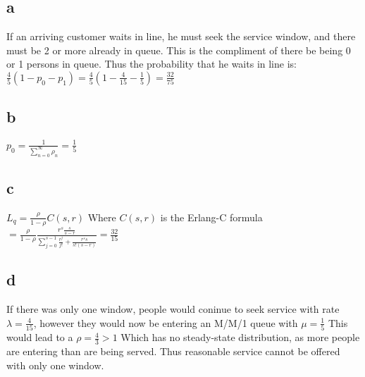 \documentclass[10pt, letterpaper]{paper}
\begin{document}
\subsection*{a}
If an arriving customer waits in line, he must seek the service window, and there must be 2 or more already in queue. This is the compliment of there be being 0 or 1 persons in queue.
Thus the probability that he waits in line is: $\frac{4}{5} ( 1- p_0 - p_1 ) = \frac{4}{5} ( 1 - \frac{ 4}{15} - \frac{1}{5} ) = \frac{ 32}{75}$
\subsection*{b} 
$p_0 = \frac{ 1 }{ \sum_{n=0}^\infty \rho_n} = \frac{1}{5}$
\subsection*{c}
$L_q = \frac{ \rho }{ 1 - \rho } C( s,r )$ Where $C(s,r)$ is the Erlang-C formula $= \frac{ \rho }{ 1 - \rho } \frac{ r^s \frac{ s }{ s- r} }{ \sum_{j=0}^{s-1} \frac{r^j}{j!} + \frac{ r^s s }{s! (s-r)} } = \frac{ 32}{15}$
\subsection*{d}
If there was only one window, people would coninue to seek service with rate $\lambda = \frac{4}{15}$, however they would now be entering an M/M/1 queue with $\mu = \frac{1}{5}$ This would lead to a $\rho = \frac{4}{3} > 1$ Which has no steady-state distribution, as more people are entering than are being served. Thus reasonable service cannot be offered with only one window.
\end{document}
